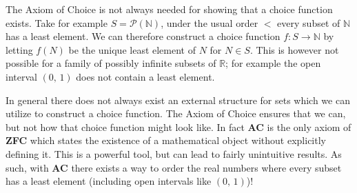 \documentclass[../../main.tex]{subfiles}
\begin{document}
The Axiom of Choice is not always needed for showing that a choice function exists.
Take for example $S = \mathcal{P}(\mathbb{N})$, under the usual order $<$ every subset of $\mathbb{N}$ has a least element.
We can therefore construct a choice function $f: S \to \mathbb{N}$ by letting $f(N)$ be the unique least element of $N$ for $N \in S$.
This is however not possible for a family of possibly infinite subsets of $\mathbb{R}$; for example the open interval $\left(0,\, 1\right)$ does not contain a least element.

In general there does not always exist an external structure for sets which we can utilize to construct a choice function.
The Axiom of Choice ensures that we can, but not how that choice function might look like.
In fact \textbf{AC} is the only axiom of \textbf{ZFC} which states the existence of a mathematical object without explicitly defining it.
This is a powerful tool, but can lead to fairly unintuitive results. 
As such, with \textbf{AC} there exists a way to order the real numbers where every subset has a least element (including open intervals like $\left(0,\, 1\right)$)!
\end{document}
